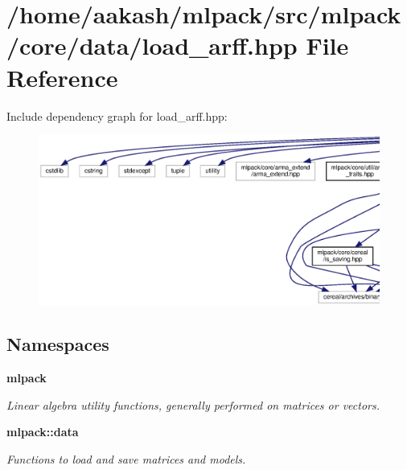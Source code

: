 \section{/home/aakash/mlpack/src/mlpack/core/data/load\+\_\+arff.hpp File Reference}
\label{load__arff_8hpp}
Include dependency graph for load\+\_\+arff.\+hpp\+:
\nopagebreak
\begin{figure}[H]
\begin{center}
\leavevmode
\includegraphics[width=350pt]{load__arff_8hpp__incl}
\end{center}
\end{figure}
\subsection*{Namespaces}
\begin{DoxyCompactItemize}
\item 
 \textbf{ mlpack}
\begin{DoxyCompactList}\small\item\em Linear algebra utility functions, generally performed on matrices or vectors. \end{DoxyCompactList}\item 
 \textbf{ mlpack\+::data}
\begin{DoxyCompactList}\small\item\em Functions to load and save matrices and models. \end{DoxyCompactList}\end{DoxyCompactItemize}
